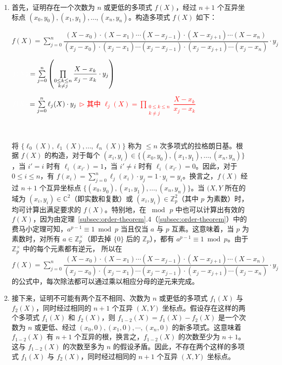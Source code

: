 \begin{myproof}
\begin{enumerate}


\item 首先，证明存在一个次数为 $n$ 或更低的多项式 $f(X)$，经过 $n+1$ 个互异坐标点 $(x_0, y_0), (x_1, y_1), \ldots, (x_n, y_n)$。构造多项式 $f(X)$ 如下：

$f(X) = \sum\limits_{j=0}^{n}\dfrac{(X-x_0)\cdot(X-x_1)\cdots(X-x_{j-1})\cdot(X-x_{j+1})\cdots(X-x_{n})}{(x_j-x_0)\cdot(x_j-x_1)\cdots(x_j-x_{j-1})\cdot(x_j-x_{j+1})\cdots(x_j-x_{n})}\cdot y_j$

$ \textcolor{white}{f(X) }= \sum\limits_{j=0}^{n} \left( \prod\limits_{\substack{0 \le k \le n\\ k \ne j}} \dfrac{X - x_k}{x_j - x_k} \cdot y_j\right)$

$ \textcolor{white}{f(X) }= \sum\limits_{j=0}^{n} \ell_j(X) \cdot y_j$ \textcolor{red}{ $\rhd$ 其中 $\ell_j(X) =  \prod\limits_{\substack{0 \le k \le n\\ k \ne j}} \dfrac{X - x_k}{x_j - x_k}$}

$ $

将 $\{\ell_0(X), \ell_1(X), \ldots, \ell_{n}(X) \}$ 称为 $\leq n$ 次多项式的拉格朗日基。根据 $f(X)$ 的构造，对于每个 $(x_i, y_i) \in \{(x_0, y_0), (x_1, y_1), \ldots, (x_n, y_n)\}$，\text{ }当 $i' = i$ 时有 $\ell_i(x_{i'}) = 1$，当 $i' \neq i$ 时有 $\ell_i(x_{i'}) = 0$。因此，对于 $0 \leq i \leq n$，有 $f(x_i) = \sum\limits_{j=0}^{n} \ell_j(x_i) \cdot y_j = 1 \cdot y_i = y_i$。换言之，$f(X)$ 经过 $n+1$ 个互异坐标点 $\{(x_0, y_0), (x_1, y_1), \ldots, (x_n, y_n)\}$。当 $(X, Y$ 所在的域为 $(x_i, y_i) \in \mathbb{C}^2$（即实数和复数）或 $(x_i, y_i) \in \mathbb{Z}_p^2$（其中 $p$ 为素数）时，均可计算出满足要求的 $f(X)$。特别地，在 $\bmod \, p$ 中也可以计算出有效的 $f(X)$，因为由定理~\ref*{subsec:order-theorem}.4（\autoref{subsec:order-theorem}）中的费马小定理可知，$a^{p - 1} \equiv 1 \bmod p$ 当且仅当 $a$ 与 $p$ 互素。这意味着，当 $p$ 为素数时，对所有 $a \in \mathbb{Z}_p^{\times}$（即去掉 $\{0\}$ 后的 $\mathbb{Z}_p$），都有 $a^{p - 1} \equiv 1 \bmod p$。由于 $\mathbb{Z}_p^{\times}$ 中的每个元素都有逆元，
所以在 $f(X) = \sum\limits_{j=0}^{n}\dfrac{(X-x_0)\cdot(X-x_1)\cdots(X-x_{j-1})\cdot(X-x_{j+1})\cdots(X-x_{n})}{(x_j-x_0)\cdot(x_j-x_1)\cdots(x_j-x_{j-1})\cdot(x_j-x_{j+1})\cdots(x_j-x_{n})}\cdot y_j$ 的公式中，每次除法都可以通过乘以相应分母的逆元来完成。
 
\item 接下来，证明不可能有两个互不相同、次数为 $n$ 或更低的多项式 $f_1(X)$ 与 $f_2(X)$，同时经过相同的 $n+1$ 个互异 $(X, Y)$ 坐标点。假设存在这样的两个多项式 $f_1(X)$ 和 $f_2(X)$，则 $f_{1-2}(X) = f_1(X) - f_2(X)$ 是一个次数为 $n$ 或更低、经过 $(x_0, 0), (x_1, 0), \cdots, (x_n, 0)$ 的新多项式。这意味着 $f_{1-2}(X)$ 有 $n+1$ 个互异的根，换言之，$f_{1-2}(X)$ 的次数至少为 $n+1$。这与 $f_{1-2}(X)$ 的次数至多为 $n$ 的假设矛盾。因此，不存在两个这样的多项式 $f_1(X)$ 与 $f_2(X)$，同时经过相同的 $n+1$ 个互异 $(X, Y)$ 坐标点。


\end{enumerate}
\end{myproof}
